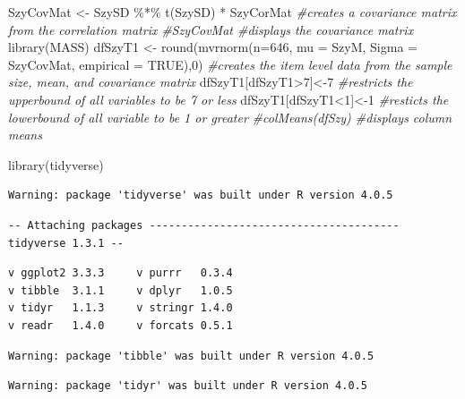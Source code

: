 \documentclass[
  english,
]{book}
\newenvironment{Shaded}{\begin{snugshade}}{\end{snugshade}}
\newcommand{\AttributeTok}[1]{\textcolor[rgb]{0.77,0.63,0.00}{#1}}
\newcommand{\CommentTok}[1]{\textcolor[rgb]{0.56,0.35,0.01}{\textit{#1}}}
\newcommand{\ConstantTok}[1]{\textcolor[rgb]{0.00,0.00,0.00}{#1}}
\newcommand{\DecValTok}[1]{\textcolor[rgb]{0.00,0.00,0.81}{#1}}
\newcommand{\FunctionTok}[1]{\textcolor[rgb]{0.00,0.00,0.00}{#1}}
\newcommand{\NormalTok}[1]{#1}
\newcommand{\OtherTok}[1]{\textcolor[rgb]{0.56,0.35,0.01}{#1}}
\newcommand{\SpecialCharTok}[1]{\textcolor[rgb]{0.00,0.00,0.00}{#1}}
\begin{document}
\begin{Shaded}
\begin{Highlighting}[]
\NormalTok{SzyCovMat }\OtherTok{\textless{}{-}}\NormalTok{ SzySD }\SpecialCharTok{\%*\%} \FunctionTok{t}\NormalTok{(SzySD) }\SpecialCharTok{*}\NormalTok{ SzyCorMat }\CommentTok{\#creates a covariance matrix from the correlation matrix}
\CommentTok{\#SzyCovMat \#displays the covariance matrix}
\FunctionTok{library}\NormalTok{(MASS)}
\NormalTok{dfSzyT1 }\OtherTok{\textless{}{-}} \FunctionTok{round}\NormalTok{(}\FunctionTok{mvrnorm}\NormalTok{(}\AttributeTok{n=}\DecValTok{646}\NormalTok{, }\AttributeTok{mu =}\NormalTok{ SzyM, }\AttributeTok{Sigma =}\NormalTok{ SzyCovMat, }\AttributeTok{empirical =} \ConstantTok{TRUE}\NormalTok{),}\DecValTok{0}\NormalTok{) }\CommentTok{\#creates the item level data from the sample size, mean, and covariance matrix}
\NormalTok{dfSzyT1[dfSzyT1}\SpecialCharTok{\textgreater{}}\DecValTok{7}\NormalTok{]}\OtherTok{\textless{}{-}}\DecValTok{7} \CommentTok{\#restricts the upperbound of all variables to be 7 or less}
\NormalTok{dfSzyT1[dfSzyT1}\SpecialCharTok{\textless{}}\DecValTok{1}\NormalTok{]}\OtherTok{\textless{}{-}}\DecValTok{1} \CommentTok{\#resticts the lowerbound of all variable to be 1 or greater}
\CommentTok{\#colMeans(dfSzy) \#displays column means}

\FunctionTok{library}\NormalTok{(tidyverse)}
\end{Highlighting}
\end{Shaded}

\begin{verbatim}
Warning: package 'tidyverse' was built under R version 4.0.5
\end{verbatim}

\begin{verbatim}
-- Attaching packages --------------------------------------- tidyverse 1.3.1 --
\end{verbatim}

\begin{verbatim}
v ggplot2 3.3.3     v purrr   0.3.4
v tibble  3.1.1     v dplyr   1.0.5
v tidyr   1.1.3     v stringr 1.4.0
v readr   1.4.0     v forcats 0.5.1
\end{verbatim}

\begin{verbatim}
Warning: package 'tibble' was built under R version 4.0.5
\end{verbatim}

\begin{verbatim}
Warning: package 'tidyr' was built under R version 4.0.5
\end{verbatim}
\end{document}

